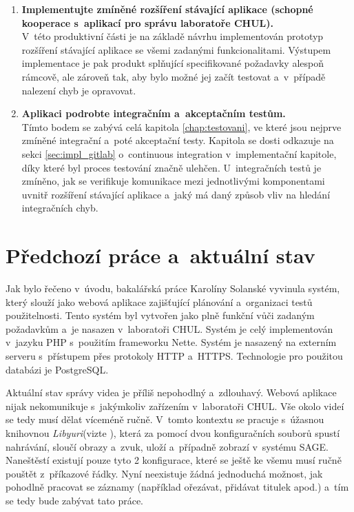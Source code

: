 \documentclass[thesis=M,czech]{FITthesis}[2012/06/26]
\begin{document}
\begin{enumerate}
	\item \textbf{Implementujte zmíněné rozšíření stávající aplikace (schopné kooperace s~aplikací pro správu laboratoře
CHUL).\\}
	V~této produktivní části je na základě návrhu implementován prototyp rozšíření stávající aplikace se všemi zadanými funkcionalitami. Výstupem implementace je pak produkt splňující specifikované požadavky alespoň rámcově, ale zároveň tak, aby bylo možné jej začít testovat a~v~případě nalezení chyb je opravovat.  
	\item \textbf{Aplikaci podrobte integračním a~akceptačním testům.\\}
	Tímto bodem se zabývá celá kapitola \ref{chap:testovani}, ve které jsou nejprve zmíněné integrační a~poté akceptační testy. Kapitola se dosti odkazuje na sekci \ref{sec:impl_gitlab} o~continuous integration v~implementační kapitole, díky které byl proces testování značně ulehčen. U~integračních testů je zmíněno, jak se verifikuje komunikace mezi jednotlivými komponentami uvnitř rozšíření stávající aplikace a~jaký má daný způsob vliv na hledání integračních chyb.
\end{enumerate}

\section{Předchozí práce a~aktuální stav} \label{sec:analyza_predchozi_prace}
Jak bylo řečeno v~úvodu, bakalářská práce Karolíny Solanské vyvinula systém, který slouží jako webová aplikace zajišťující plánování a~organizaci testů použitelnosti. Tento systém byl vytvořen jako plně funkční vůči zadaným požadavkům a~je nasazen v~laboratoři CHUL. Systém je celý implementován v~jazyku PHP s~použitím frameworku Nette. Systém je nasazený na externím serveru s~přístupem přes protokoly HTTP a~HTTPS. Technologie pro použitou databázi je PostgreSQL.
	
	Aktuální stav správy videa je příliš nepohodlný a~zdlouhavý. Webová aplikace nijak nekomunikuje s~jakýmkoliv zařízením v~laboratoři CHUL. Vše okolo videí se tedy musí dělat víceméně ručně. V~tomto kontextu se pracuje s~úžasnou knihovnou \textit{Libyuri}(vizte \cite{yuri}), která za pomocí dvou konfiguračních souborů spustí nahrávání, sloučí obrazy a~zvuk, uloží a~případně zobrazí v~systému SAGE. Naneštěstí existují pouze tyto 2 konfigurace, které se ještě ke všemu musí ručně pouštět z~příkazové řádky. Nyní neexistuje žádná jednoduchá možnost, jak pohodlně pracovat se záznamy (například ořezávat, přidávat titulek apod.) a~tím se tedy bude zabývat tato práce.
	
\end{document}
